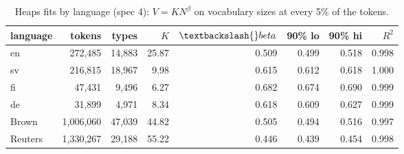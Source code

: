 \begin{table}[htbp]
\centering
\small
\caption{Heaps fits by language (spec 4): $V = K N^\beta$ on vocabulary sizes at every 5\% of the tokens.}
\label{tab:heaps-language}
\begin{tabular}{lrrrrrrr}
\toprule
language & tokens & types & $K$ & $\textbackslash{}beta$ & 90\% lo & 90\% hi & $R^2$ \\
\midrule
en & 272{,}485 & 14{,}883 & 25.87 & 0.509 & 0.499 & 0.518 & 0.998 \\
sv & 216{,}815 & 18{,}967 & 9.98 & 0.615 & 0.612 & 0.618 & 1.000 \\
fi & 47{,}431 & 9{,}496 & 6.27 & 0.682 & 0.674 & 0.690 & 0.999 \\
de & 31{,}899 & 4{,}971 & 8.34 & 0.618 & 0.609 & 0.627 & 0.999 \\
Brown & 1{,}006{,}060 & 47{,}039 & 44.82 & 0.505 & 0.494 & 0.516 & 0.997 \\
Reuters & 1{,}330{,}267 & 29{,}188 & 55.22 & 0.446 & 0.439 & 0.454 & 0.998 \\
\bottomrule
\end{tabular}
\end{table}
